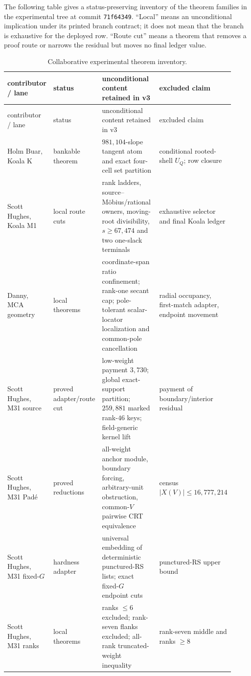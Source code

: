 \documentclass[11pt,a4paper]{amsart}
\numberwithin{equation}{section}
\theoremstyle{remark}
\begin{document}
The following table gives a status-preserving inventory of the theorem families in the experimental tree at commit \texttt{71f64349}.  ``Local'' means an unconditional implication under its printed branch contract; it does not mean that the branch is exhaustive for the deployed row.  ``Route cut'' means a theorem that removes a proof route or narrows the residual but moves no final ledger value.

\small\begin{longtable}{@{}>{\raggedright\arraybackslash}p{0.15\linewidth}>{\raggedright\arraybackslash}p{0.18\linewidth}>{\raggedright\arraybackslash}p{0.40\linewidth}>{\raggedright\arraybackslash}p{0.19\linewidth}@{}}
\caption{Collaborative experimental theorem inventory.}\label{tab:experimental-ledger}\\
\toprule
contributor / lane & status & unconditional content retained in v3 & excluded claim\\
\midrule
\endfirsthead
\toprule
contributor / lane & status & unconditional content retained in v3 & excluded claim\\
\midrule
\endhead
Holm Buar, Koala K & bankable theorem & $981{,}104$-slope tangent atom and exact four-cell set partition & conditional rooted-shell $U_Q$; row closure\\
Scott Hughes, Koala M1 & local route cuts & rank ladders, source--M\"obius/rational owners, moving-root divisibility, $s\ge67{,}474$ and two one-slack terminals & exhaustive selector and final Koala ledger\\
Danny, MCA geometry & local theorems & coordinate-span ratio confinement; rank-one secant cap; pole-tolerant scalar-locator localization and common-pole cancellation & radial occupancy, first-match adapter, endpoint movement\\
Scott Hughes, M31 source & proved adapter/route cut & low-weight payment $3{,}730$; global exact-support partition; $259{,}881$ marked rank-$46$ keys; field-generic kernel lift & payment of boundary/interior residual\\
Scott Hughes, M31 Pad\'e & proved reductions & all-weight anchor module, boundary forcing, arbitrary-unit obstruction, common-$V$ pairwise CRT equivalence & census $|X(V)|\le16{,}777{,}214$\\
Scott Hughes, M31 fixed-$G$ & hardness adapter & universal embedding of deterministic punctured-RS lists; exact fixed-$G$ endpoint cuts & punctured-RS upper bound\\
Scott Hughes, M31 ranks & local theorems & ranks $\le6$ excluded; rank-seven flanks excluded; all-rank truncated-weight inequality & rank-seven middle and ranks $\ge8$\\

\end{longtable}
\end{document}
